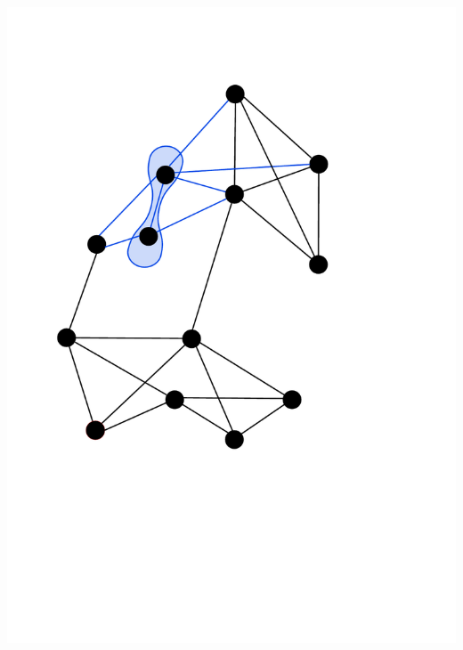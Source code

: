 \documentclass[titlepage,german,presentation]{beamer}
\begin{document}
\begin{frame}
\includegraphics[height=0.6\textheight]{min-cut-3.pdf}

\end{frame}
\end{document}
